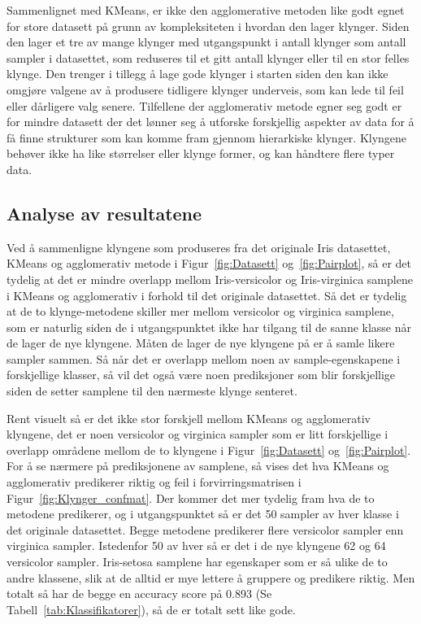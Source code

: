 \documentclass[twocolumn,norwegian]{article}
\begin{document}
	Sammenlignet med KMeans, er ikke den agglomerative metoden like godt egnet for store datasett på grunn av kompleksiteten i hvordan den lager klynger. Siden den lager et tre av mange klynger med utgangspunkt i antall klynger som antall sampler i datasettet, som reduseres til et gitt antall klynger eller til en stor felles klynge. Den trenger i tillegg å lage gode klynger i starten siden den kan ikke omgjøre valgene av å produsere tidligere klynger underveis, som kan lede til feil eller dårligere valg senere. Tilfellene der agglomerativ metode egner seg godt er for mindre datasett der det lønner seg å utforske forskjellig aspekter av data for å få finne strukturer som kan komme fram gjennom hierarkiske klynger. Klyngene behøver ikke ha like størrelser eller klynge former, og kan håndtere flere typer data.
	
	
	\subsection{Analyse av resultatene}
	Ved å sammenligne klyngene som produseres fra det originale Iris datasettet, KMeans og agglomerativ metode i Figur~\ref{fig:Datasett} og~\ref{fig:Pairplot}, så er det tydelig at det er mindre overlapp mellom Iris-versicolor og Iris-virginica samplene i KMeans og agglomerativ i forhold til det originale datasettet. Så det er tydelig at de to klynge-metodene skiller mer mellom versicolor og virginica samplene, som er naturlig siden de i utgangspunktet ikke har tilgang til de sanne klasse når de lager de nye klyngene. Måten de lager de nye klyngene på er å samle likere sampler sammen. Så når det er overlapp mellom noen av sample-egenskapene i forskjellige klasser, så vil det også være noen prediksjoner som blir forskjellige siden de setter samplene til den nærmeste klynge senteret.
	
	Rent visuelt så er det ikke stor forskjell mellom KMeans og agglomerativ klyngene, det er noen versicolor og virginica sampler som er litt forskjellige i overlapp områdene mellom de to klyngene i Figur~\ref{fig:Datasett} og~\ref{fig:Pairplot}. For å se nærmere på prediksjonene av samplene, så vises det hva KMeans og agglomerativ predikerer riktig og feil i forvirringsmatrisen i Figur~\ref{fig:Klynger_confmat}. Der kommer det mer tydelig fram hva de to metodene predikerer, og i utgangspunktet så er det 50 sampler av hver klasse i det originale datasettet. Begge metodene predikerer flere versicolor sampler enn virginica sampler. Istedenfor 50 av hver så er det i de nye klyngene 62 og 64 versicolor sampler. Iris-setosa samplene har egenskaper som er så ulike de to andre klassene, slik at de alltid er mye lettere å gruppere og predikere riktig. Men totalt så har de begge en accuracy score på 0.893 (Se Tabell~\ref{tab:Klassifikatorer}), så de er totalt sett like gode.
	
\end{document}

